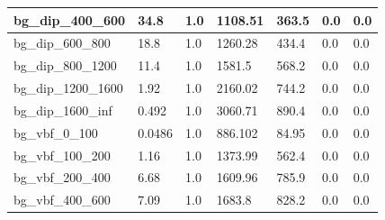 \documentclass[a4paper, 10pt]{article}
\begin{document}
\begin{table}[H]
\begin{center}
\begin{tabular}{|m{23.0mm}|m{23.0mm}|m{18.0mm}|m{19.0mm}|m{19.0mm}|m{19.0mm}|m{19.0mm}|}
      \hline
      {\cellcolor{white}         bg\_dip\_400\_600}& {\cellcolor{white}         34.8}& {\cellcolor{white}         1.0}& {\cellcolor{white}         1108.51}& {\cellcolor{white}         363.5}& {\cellcolor{green}         0.0}& {\cellcolor{green}         0.0}\\
      \hline
      {\cellcolor{white}         bg\_dip\_600\_800}& {\cellcolor{white}         18.8}& {\cellcolor{white}         1.0}& {\cellcolor{white}         1260.28}& {\cellcolor{white}         434.4}& {\cellcolor{green}         0.0}& {\cellcolor{green}         0.0}\\
      \hline
      {\cellcolor{white}         bg\_dip\_800\_1200}& {\cellcolor{white}         11.4}& {\cellcolor{white}         1.0}& {\cellcolor{white}         1581.5}& {\cellcolor{white}         568.2}& {\cellcolor{green}         0.0}& {\cellcolor{green}         0.0}\\
      \hline
      {\cellcolor{white}         bg\_dip\_1200\_1600}& {\cellcolor{white}         1.92}& {\cellcolor{white}         1.0}& {\cellcolor{white}         2160.02}& {\cellcolor{white}         744.2}& {\cellcolor{green}         0.0}& {\cellcolor{green}         0.0}\\
      \hline
      {\cellcolor{white}         bg\_dip\_1600\_inf}& {\cellcolor{white}         0.492}& {\cellcolor{white}         1.0}& {\cellcolor{white}         3060.71}& {\cellcolor{white}         890.4}& {\cellcolor{green}         0.0}& {\cellcolor{green}         0.0}\\
      \hline
      {\cellcolor{white}         bg\_vbf\_0\_100}& {\cellcolor{white}         0.0486}& {\cellcolor{white}         1.0}& {\cellcolor{white}         886.102}& {\cellcolor{white}         84.95}& {\cellcolor{green}         0.0}& {\cellcolor{green}         0.0}\\
      \hline
      {\cellcolor{white}         bg\_vbf\_100\_200}& {\cellcolor{white}         1.16}& {\cellcolor{white}         1.0}& {\cellcolor{white}         1373.99}& {\cellcolor{white}         562.4}& {\cellcolor{green}         0.0}& {\cellcolor{green}         0.0}\\
      \hline
      {\cellcolor{white}         bg\_vbf\_200\_400}& {\cellcolor{white}         6.68}& {\cellcolor{white}         1.0}& {\cellcolor{white}         1609.96}& {\cellcolor{white}         785.9}& {\cellcolor{green}         0.0}& {\cellcolor{green}         0.0}\\
      \hline
      {\cellcolor{white}         bg\_vbf\_400\_600}& {\cellcolor{white}         7.09}& {\cellcolor{white}         1.0}& {\cellcolor{white}         1683.8}& {\cellcolor{white}         828.2}& {\cellcolor{green}         0.0}& {\cellcolor{green}         0.0}\\

\end{tabular}
\end{center}
\end{table}
\end{document}
